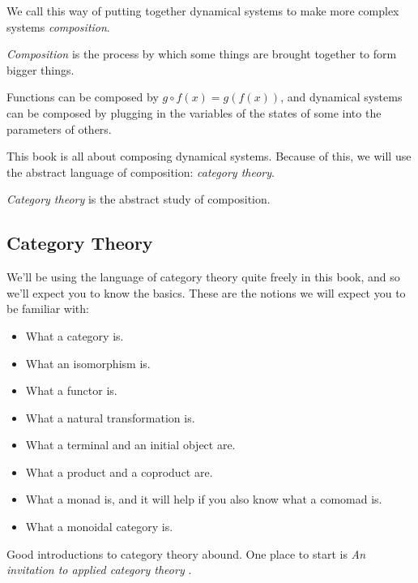 \documentclass[DynamicalBook]{subfiles}
\begin{document}

We call this way of putting together dynamical systems to make more complex
systems \emph{composition}.
\begin{informal}
  \emph{Composition} is the process by which some things are brought together to
  form bigger things.
\end{informal}


Functions can be composed by $g \circ f(x) = g(f(x))$, and dynamical systems
can be composed by plugging in the variables of the states of some into the
parameters of others.
  
This book is all about composing dynamical systems. Because of this, we will use
the abstract language of composition: \emph{category theory}.
\begin{informal}
\emph{Category theory} is the abstract study of composition.
\end{informal}



\subsection{Category Theory}

We'll be using the language of category theory quite freely in this book, and so
we'll expect you to know the basics. These are the notions we will expect you to
be familiar with:
\begin{itemize}
\item What a category is.
\item What an isomorphism is.
\item What a functor is.
\item What a natural transformation is.
\item What a terminal and an initial object are.
\item What a product and a coproduct are.
\item What a monad is, and it will help if you also know what a comomad is.
  \item What a monoidal category is.
\end{itemize}

Good introductions to category theory abound. One place to start is \emph{An invitation to applied category theory} \cite{fong2019seven}.
\end{document}
